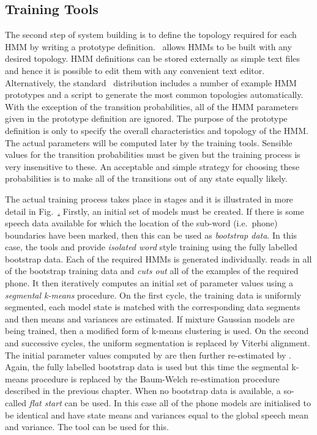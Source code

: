 \subsection{Training Tools}

The second step of system building is to
define the topology required for each HMM by writing a prototype definition.
\HTK\ allows HMMs to be built with any desired topology.
HMM definitions can be stored externally as simple text files and
hence it is possible to edit them with any convenient text
editor. Alternatively, the standard \HTK\ distribution includes
a number of example HMM prototypes and a script to generate
the most common topologies automatically.
With the exception of the transition
probabilities, all of the HMM parameters given in 
the prototype definition
are ignored.  The purpose of the prototype definition is only
to specify the overall characteristics and topology of the HMM.  The
actual parameters will be computed later by the training tools.  
Sensible values for
the transition probabilities must be given but the training
process is very insensitive to these.  An acceptable and  simple strategy
for choosing these probabilities is to make all of the transitions
out of any state equally likely.



The actual training process takes place in stages and it is
illustrated in more detail in Fig.~\href{f:tsubword}.  
Firstly, an initial set of models must be created.  If there is
some speech data available for which the location of the sub-word (i.e.\ phone)
boundaries have been marked, then this can be used as \textit{bootstrap data}.
In this case, the tools  
and 
provide {\it isolated word} style
training using the fully labelled bootstrap data.  Each of the required
HMMs is generated individually.   reads in all of the bootstrap
training data and {\it cuts out} all of the examples of the required
phone.  It then iteratively computes an initial set of parameter values
using a {\it segmental k-means} procedure.  On the first cycle, the training data
is uniformly segmented, each model state is matched with the
corresponding data segments and then means and variances are estimated.
If mixture Gaussian models are being trained, then a modified form
of k-means clustering is used.  On the second and successive cycles,
the uniform segmentation is replaced by Viterbi alignment.  
The initial parameter values computed by  are then further re-estimated
by .  Again, the fully labelled bootstrap data is used but this
time the segmental k-means procedure is replaced by the Baum-Welch re-estimation
procedure described in the previous chapter.  When no bootstrap data is
available, a so-called \textit{flat start} can be used.  In this case all
of the phone models are initialised to be identical and have state means
and variances equal to the global speech mean and variance.  The tool
 can be used for this.

